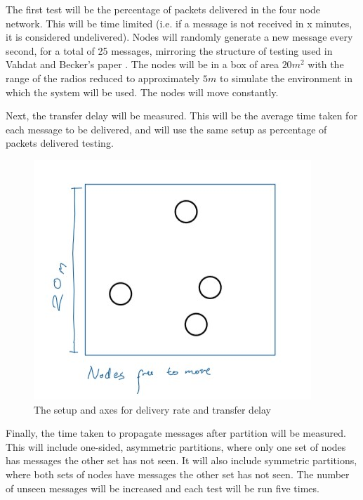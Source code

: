 \documentclass[10pt, a4paper]{article}
\begin{document}
The first test will be the percentage of packets delivered in the four node network. This will be time limited (i.e. if a message is not received in x minutes, it is considered undelivered). Nodes will randomly generate a new message every second, for a total of 25 messages, mirroring the structure of testing used in Vahdat and Becker's paper \cite{epidemic}. The nodes will be in a box of area $20m^2$ with the range of the radios reduced to approximately $5m$ to simulate the environment in which the system will be used. The nodes will move constantly.

Next, the transfer delay will be measured. This will be the average time taken for each message to be delivered, and will use the same setup as percentage of packets delivered testing.

\begin{figure}[h]
\caption{The setup and axes for delivery rate and transfer delay}
\begin{center}
\includegraphics[scale=0.5]{transfer.jpg}
\end{center}
\end{figure}


Finally, the time taken to propagate messages after partition will be measured. This will include one-sided, asymmetric partitions, where only one set of nodes has messages the other set has not seen. It will also include symmetric partitions, where both sets of nodes have messages the other set has not seen. The number of unseen messages will be increased and each test will be run five times.
\end{document}
